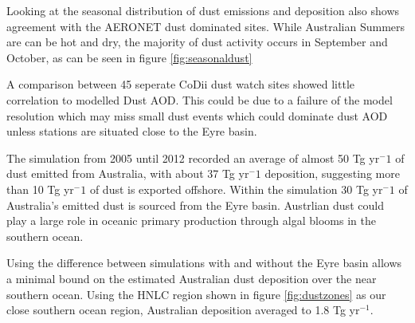 
Looking at the seasonal distribution of dust emissions and deposition also shows agreement with the AERONET dust dominated sites.
While Australian Summers are can be hot and dry, the majority of dust activity occurs in September and October, as can be seen in figure \ref{fig:seasonaldust}

A comparison between 45 seperate CoDii dust watch sites showed little correlation to modelled Dust AOD.
This could be due to a failure of the model resolution which may miss small dust events which could dominate dust AOD unless stations are situated close to the Eyre basin.

The simulation from 2005 until 2012 recorded an average of almost 50 Tg yr$^-1$ of dust emitted from Australia, with about 37 Tg yr$^-1$ deposition, suggesting more than 10 Tg yr$^-1$ of dust is exported offshore.
Within the simulation 30 Tg yr$^-1$ of Australia's emitted dust is sourced from the Eyre basin.
Austrlian dust could play a large role in oceanic primary production through algal blooms in the southern ocean.

Using the difference between simulations with and without the Eyre basin allows a minimal bound on the estimated Australian dust deposition over the near southern ocean.
Using the HNLC region shown in figure \ref{fig:dustzones} as our close southern ocean region, Australian deposition averaged to 1.8 Tg yr$^{-1}$.